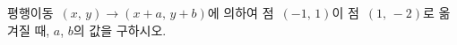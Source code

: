 평행이동~$(x,\,y)\longrightarrow(x+a,\,y+b)$에 의하여 점~$(-1,\,1)$이 점~$(1,\,-2)$로 옮겨질 때, $a$, $b$의 값을 구하시오.
